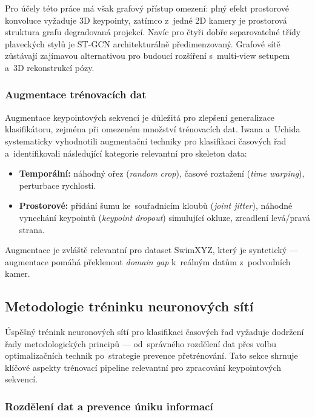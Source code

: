 Pro účely této práce má však grafový přístup omezení: plný efekt prostorové konvoluce vyžaduje 3D keypointy, zatímco z~jedné 2D kamery je prostorová struktura grafu degradovaná projekcí. Navíc pro čtyři dobře separovatelné třídy plaveckých stylů je ST-GCN architekturálně předimenzovaný. Grafové sítě zůstávají zajímavou alternativou pro budoucí rozšíření s~multi-view setupem a~3D rekonstrukcí pózy.

\subsubsection{Augmentace trénovacích dat}
\label{subsubsec:augmentace}

Augmentace keypointových sekvencí je důležitá pro zlepšení generalizace klasifikátoru, zejména při omezeném množství trénovacích dat. Iwana a~Uchida~\cite{iwana2021augmentation} systematicky vyhodnotili augmentační techniky pro klasifikaci časových řad a~identifikovali následující kategorie relevantní pro skeleton data:
\begin{itemize}
    \item \textbf{Temporální:} náhodný ořez (\textit{random crop}), časové roztažení (\textit{time warping}), perturbace rychlosti.
    \item \textbf{Prostorové:} přidání šumu ke~souřadnicím kloubů (\textit{joint jitter}), náhodné vynechání keypointů (\textit{keypoint dropout}) simulující okluze, zrcadlení levá/pravá strana.
\end{itemize}
Augmentace je zvláště relevantní pro dataset SwimXYZ, který je syntetický --- augmentace pomáhá překlenout \textit{domain gap} k~reálným datům z~podvodních kamer.

\subsection{Metodologie tréninku neuronových sítí}
\label{subsec:metodologie_treninku}

Úspěšný trénink neuronových sítí pro klasifikaci časových řad vyžaduje dodržení řady metodologických principů --- od~správného rozdělení dat přes volbu optimalizačních technik po~strategie prevence přetrénování. Tato sekce shrnuje klíčové aspekty trénovací pipeline relevantní pro zpracování keypointových sekvencí.

\subsubsection{Rozdělení dat a prevence úniku informací}
\label{subsubsec:data_split}

